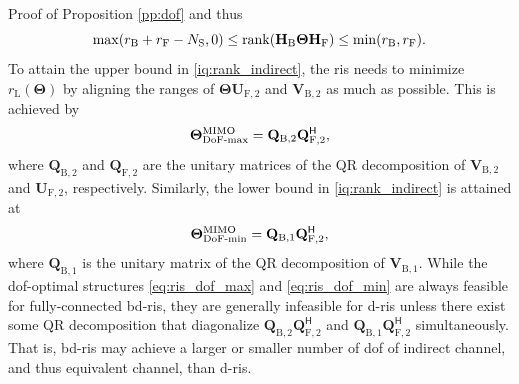\documentclass[journal]{IEEEtran}
\begin{document}
\begin{appendix}
\begin{subsection}{Proof of Proposition \ref{pp:dof}}
		and thus
		\begin{equation}
			\label{iq:rank_indirect}
			\max(r_\mathrm{B} + r_\mathrm{F} - N_\mathrm{S}, 0) \le \operatorname{rank}(\mathbf{H}_\mathrm{B} \mathbf{\Theta} \mathbf{H}_\mathrm{F}) \le \min(r_\mathrm{B}, r_\mathrm{F}).
		\end{equation}
		To attain the upper bound in \eqref{iq:rank_indirect}, the \gls{ris} needs to minimize $r_\mathrm{L}(\mathbf{\Theta})$ by aligning the ranges of $\mathbf{\Theta} \mathbf{U}_{\mathrm{F},2}$ and $\mathbf{V}_{\mathrm{B},2}$ as much as possible.
		This is achieved by
		\begin{equation}
			\label{eq:ris_dof_max}
			\mathbf{\Theta}_{\textnormal{DoF-max}}^{\textnormal{MIMO}} = \mathbf{Q}_{\mathrm{B},2} \mathbf{Q}_{\mathrm{F},2}^\mathsf{H},
		\end{equation}
		where $\mathbf{Q}_{\mathrm{B},2}$ and $\mathbf{Q}_{\mathrm{F},2}$ are the unitary matrices of the QR decomposition of $\mathbf{V}_{\mathrm{B},2}$ and $\mathbf{U}_{\mathrm{F},2}$, respectively.
		Similarly, the lower bound in \eqref{iq:rank_indirect} is attained at
		\begin{equation}
			\label{eq:ris_dof_min}
			\mathbf{\Theta}_{\textnormal{DoF-min}}^{\textnormal{MIMO}} = \mathbf{Q}_{\mathrm{B},1} \mathbf{Q}_{\mathrm{F},2}^\mathsf{H},
		\end{equation}
		where $\mathbf{Q}_{\mathrm{B},1}$ is the unitary matrix of the QR decomposition of $\mathbf{V}_{\mathrm{B},1}$.
		While the \gls{dof}-optimal structures \eqref{eq:ris_dof_max} and \eqref{eq:ris_dof_min} are always feasible for fully-connected \gls{bd}-\gls{ris}, they are generally infeasible for \gls{d}-\gls{ris} unless there exist some QR decomposition that diagonalize $\mathbf{Q}_{\mathrm{B},2} \mathbf{Q}_{\mathrm{F},2}^\mathsf{H}$ and $\mathbf{Q}_{\mathrm{B},1} \mathbf{Q}_{\mathrm{F},2}^\mathsf{H}$ simultaneously.
		That is, \gls{bd}-\gls{ris} may achieve a larger or smaller number of \gls{dof} of indirect channel, and thus equivalent channel, than \gls{d}-\gls{ris}.
	\end{subsection}


\end{appendix}
\end{document}
